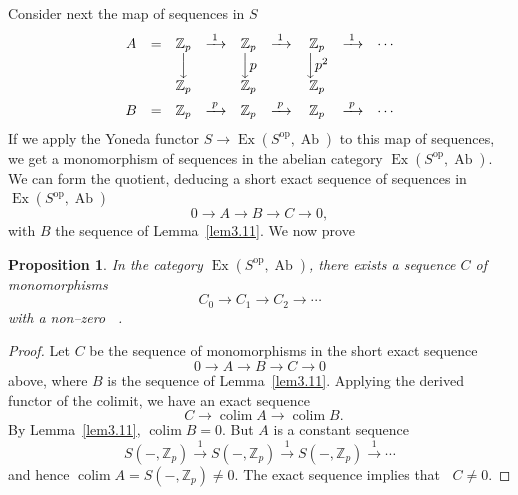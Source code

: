 \documentclass[11pt,a4paper]{article}
\theoremstyle{plain}
\newtheorem{proposition}[theorem]{Proposition}
\theoremstyle{definition}
\DeclareMathOperator{\colim}{colim}
\DeclareMathOperator{\colimone}{\colim\nolimits^{1}}
\DeclareMathOperator{\Ex}{Ex}
\DeclareMathOperator{\Ab}{Ab}
\newcommand{\op}{\mathrm{op}}
\numberwithin{equation}{section}
\begin{document}
Consider next the map of sequences in $S$
\begin{equation*}
\begin{array}{ccccccccc}
A & = & \mathbb{Z}_{p} & \xrightarrow{\;1\;} & \mathbb{Z}_{p} & \xrightarrow{\;1\;} & \mathbb{Z}_{p} & \xrightarrow{\;1\;} & \cdots \\
& & \Big\downarrow & & \Big\downarrow p & & \Big\downarrow p^{2} \\[2pt]
& & \mathbb{Z}_{p} & & \mathbb{Z}_{p} & & \mathbb{Z}_{p} \\[4pt]
B & = & \mathbb{Z}_{p} & \xrightarrow{\;p\;} & \mathbb{Z}_{p} & \xrightarrow{\;p\;} & \mathbb{Z}_{p} & \xrightarrow{\;p\;} & \cdots
\end{array}
\end{equation*}
If we apply the Yoneda functor $S \to \Ex(S^{\op},\Ab)$ to this map of sequences, we get a monomorphism of sequences in the abelian category $\Ex(S^{\op},\Ab)$. We can form the quotient, deducing a short exact sequence of sequences in $\Ex(S^{\op},\Ab)$
\begin{equation*}
0 \longrightarrow A \longrightarrow B \longrightarrow C \longrightarrow 0,
\end{equation*}
with $B$ the sequence of Lemma~\ref{lem3.11}. We now prove

\begin{proposition}\label{prop3.12}
In the category $\Ex(S^{\op},\Ab)$, there exists a sequence $C$ of monomorphisms
\begin{equation*}
C_{0} \longrightarrow C_{1} \longrightarrow C_{2} \longrightarrow \cdots
\end{equation*}
with a non--zero $\colimone$.
\end{proposition}

\begin{proof}
Let $C$ be the sequence of monomorphisms in the short exact sequence
\begin{equation*}
0 \longrightarrow A \longrightarrow B \longrightarrow C \longrightarrow 0
\end{equation*}
above, where $B$ is the sequence of Lemma~\ref{lem3.11}. Applying the derived functor of the colimit, we have an exact sequence
\begin{equation*}
\colimone C \longrightarrow \colim A \longrightarrow \colim B.
\end{equation*}
By Lemma~\ref{lem3.11}, $\colim B = 0$. But $A$ is a constant sequence
\begin{equation*}
S(-,\mathbb{Z}_{p}) \xrightarrow{\;1\;} S(-,\mathbb{Z}_{p}) \xrightarrow{\;1\;} S(-,\mathbb{Z}_{p}) \xrightarrow{\;1\;} \cdots
\end{equation*}
and hence $\colim A = S(-,\mathbb{Z}_{p}) \neq 0$. The exact sequence implies that $\colimone C \neq 0$. \qedhere
\end{proof}
\end{document}
